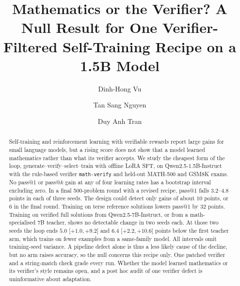 \documentclass[runningheads]{llncs}
\begin{document}
\title{Mathematics or the Verifier? A Null Result for One
Verifier-Filtered Self-Training Recipe on a 1.5B Model}


\author{Dinh-Hong Vu \and Tan Sang Nguyen \and Duy Anh Tran}

\maketitle

\begin{abstract}
Self-training and reinforcement learning with verifiable rewards report large
gains for small language models, but a rising score does not show that a
model learned mathematics rather than what its verifier accepts. We study the
cheapest form of the loop, generate--verify--select--train with offline LoRA
SFT, on Qwen2.5-1.5B-Instruct with the rule-based verifier
\texttt{math-verify} and held-out MATH-500 and GSM8K exams. No pass@1 or
pass@$k$ gain at any of four learning rates has a bootstrap interval excluding
zero. In a final 500-problem round with a revised recipe, pass@1 falls
$3.2$--$4.8$ points in each of three seeds. The design could detect only gains
of about $10$ points, or $6$ in the final round. Training on terse reference
solutions lowers pass@1 by $32$ points. Training on verified full solutions
from Qwen2.5-7B-Instruct, or from a math-specialised 7B teacher, shows no
detectable change in two seeds each. At those two seeds the loop ends $5.0$
[$+1.0,+9.2$] and $6.4$ [$+2.2,+10.6$] points below the first teacher arm,
which trains on fewer examples from a same-family model. All intervals omit
training-seed variance. A pipeline defect alone is thus a less likely cause of
the decline, but no arm raises accuracy, so the null concerns this recipe only.
One patched verifier and a string-match check grade every run. Whether the model
learned mathematics or its verifier's style remains open, and a post hoc audit
of one verifier defect is uninformative about adaptation.

\end{abstract}
\end{document}
